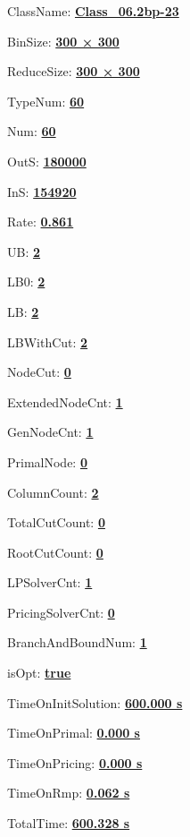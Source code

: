 \documentclass[11pt]{article}
\begin{document}
\pagestyle{empty}


ClassName: \underline{\textbf{Class_06.2bp-23}}
\par
BinSize: \underline{\textbf{300 × 300}}
\par
ReduceSize: \underline{\textbf{300 × 300}}
\par
TypeNum: \underline{\textbf{60}}
\par
Num: \underline{\textbf{60}}
\par
OutS: \underline{\textbf{180000}}
\par
InS: \underline{\textbf{154920}}
\par
Rate: \underline{\textbf{0.861}}
\par
UB: \underline{\textbf{2}}
\par
LB0: \underline{\textbf{2}}
\par
LB: \underline{\textbf{2}}
\par
LBWithCut: \underline{\textbf{2}}
\par
NodeCut: \underline{\textbf{0}}
\par
ExtendedNodeCnt: \underline{\textbf{1}}
\par
GenNodeCnt: \underline{\textbf{1}}
\par
PrimalNode: \underline{\textbf{0}}
\par
ColumnCount: \underline{\textbf{2}}
\par
TotalCutCount: \underline{\textbf{0}}
\par
RootCutCount: \underline{\textbf{0}}
\par
LPSolverCnt: \underline{\textbf{1}}
\par
PricingSolverCnt: \underline{\textbf{0}}
\par
BranchAndBoundNum: \underline{\textbf{1}}
\par
isOpt: \underline{\textbf{true}}
\par
TimeOnInitSolution: \underline{\textbf{600.000 s}}
\par
TimeOnPrimal: \underline{\textbf{0.000 s}}
\par
TimeOnPricing: \underline{\textbf{0.000 s}}
\par
TimeOnRmp: \underline{\textbf{0.062 s}}
\par
TotalTime: \underline{\textbf{600.328 s}}
\par
\newpage
\end{document}
